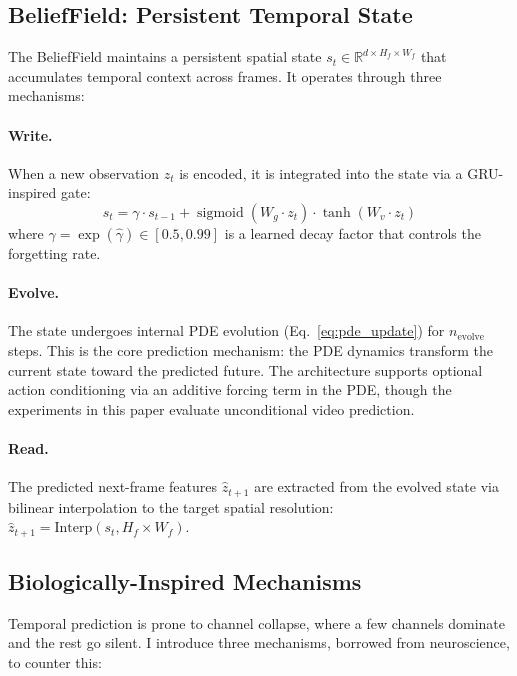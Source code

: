 \documentclass{article}
\newcommand{\R}{\mathbb{R}}
\DeclareMathOperator{\sigmoid}{sigmoid}
\begin{document}
\subsection{BeliefField: Persistent Temporal State}
\label{sec:belief}

The BeliefField maintains a persistent spatial state $s_t \in \R^{d \times H_f \times W_f}$ that accumulates temporal context across frames. It operates through three mechanisms:

\paragraph{Write.} When a new observation $z_t$ is encoded, it is integrated into the state via a GRU-inspired gate:
\begin{equation}
    s_t = \gamma \cdot s_{t-1} + \sigmoid(W_g \cdot z_t) \cdot \tanh(W_v \cdot z_t)
    \label{eq:write}
\end{equation}
where $\gamma = \exp(\hat{\gamma}) \in [0.5, 0.99]$ is a learned decay factor that controls the forgetting rate.

\paragraph{Evolve.} The state undergoes internal PDE evolution (Eq.~\ref{eq:pde_update}) for $n_{\text{evolve}}$ steps. This is the core prediction mechanism: the PDE dynamics transform the current state toward the predicted future. The architecture supports optional action conditioning via an additive forcing term in the PDE, though the experiments in this paper evaluate unconditional video prediction.

\paragraph{Read.} The predicted next-frame features $\hat{z}_{t+1}$ are extracted from the evolved state via bilinear interpolation to the target spatial resolution: $\hat{z}_{t+1} = \text{Interp}(s_t, H_f \times W_f)$.

\subsection{Biologically-Inspired Mechanisms}
\label{sec:bio}

Temporal prediction is prone to channel collapse, where a few channels dominate and the rest go silent. I introduce three mechanisms, borrowed from neuroscience, to counter this:
\end{document}
